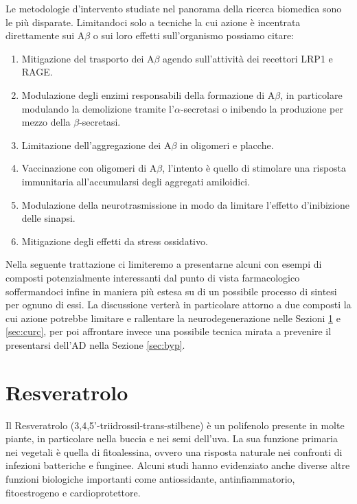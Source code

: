 \documentclass[a4paper, 12pt]{article}
\begin{document}
Le metodologie d'intervento studiate nel panorama della ricerca biomedica sono le più disparate. Limitandoci solo a tecniche la cui azione è incentrata direttamente sui A\(\beta\) o sui loro effetti sull'organismo possiamo citare:\autocite{kumar_review_2015}
\begin{enumerate}
	\item Mitigazione del trasporto dei A\(\beta\) agendo sull'attività dei recettori LRP1 e RAGE.
	\item Modulazione degli enzimi responsabili della formazione di A\(\beta\), in particolare modulando la demolizione tramite l'\(\alpha\)-secretasi o inibendo la produzione per mezzo della \(\beta\)-secretasi.
	\item Limitazione dell'aggregazione dei A\(\beta\) in oligomeri e placche.
	\item Vaccinazione con oligomeri di A\(\beta\), l'intento è quello di stimolare una risposta immunitaria all'accumularsi degli aggregati amiloidici.
	\item Modulazione della neurotrasmissione in modo da limitare l'effetto d'inibizione delle sinapsi.
	\item Mitigazione degli effetti da stress ossidativo.
\end{enumerate}

Nella seguente trattazione ci limiteremo a presentarne alcuni con esempi di composti potenzialmente interessanti dal punto di vista farmacologico soffermandoci infine in maniera più estesa su di un possibile processo di sintesi per ognuno di essi.
La discussione verterà in particolare attorno a due composti la cui azione potrebbe limitare e rallentare la neurodegenerazione nelle Sezioni \ref{sec:resv} e \ref{sec:curc}, per poi affrontare invece una possibile tecnica mirata a prevenire il presentarsi dell'AD nella Sezione \ref{sec:byp}.

\section{Resveratrolo}
\label{sec:resv}
Il Resveratrolo (3,4,5'-triidrossil-trans-stilbene) è un polifenolo presente in molte piante, in particolare nella buccia e nei semi dell'uva. La sua funzione primaria nei vegetali è quella di fitoalessina, ovvero una risposta naturale nei confronti di infezioni batteriche e funginee. Alcuni studi hanno evidenziato anche diverse altre funzioni biologiche importanti come antiossidante, antinfiammatorio, fitoestrogeno e cardioprotettore.
\end{document}
